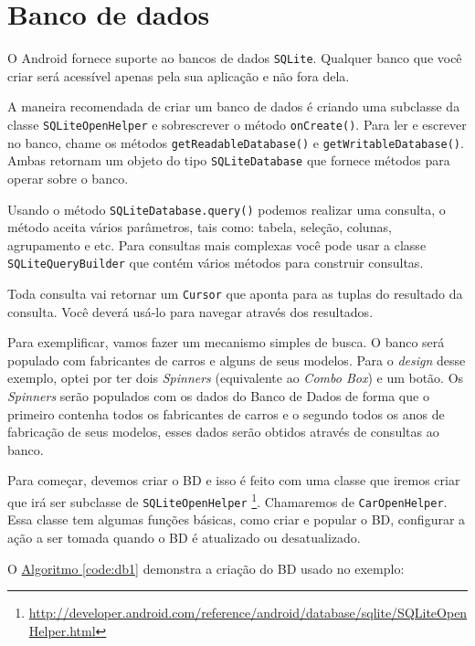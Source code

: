 \documentclass[a4paper,12pt,brazil,oneside]{book}
\begin{document}
		\section{Banco de dados}

		O Android fornece suporte ao bancos de dados \texttt{SQLite}. Qualquer banco que você criar será acessível apenas pela sua aplicação e não fora dela.

		A maneira recomendada de criar um banco de dados é criando uma subclasse da classe \texttt{SQLiteOpenHelper} e sobrescrever o método \texttt{onCreate()}. Para ler e escrever no banco, chame os métodos \texttt{getReadableDatabase()} e \texttt{getWritableDatabase()}. Ambas retornam um objeto do tipo \texttt{SQLiteDatabase} que fornece métodos para operar sobre o banco.

		Usando o método \texttt{SQLiteDatabase.query()}  podemos realizar uma consulta, o método aceita vários parâmetros, tais como: tabela, seleção, colunas, agrupamento e etc. Para consultas mais complexas você pode usar a classe \texttt{SQLiteQueryBuilder} que contém vários métodos para construir consultas.

		Toda consulta vai retornar um \texttt{Cursor} que aponta para as tuplas do resultado da consulta. Você deverá usá-lo para navegar através dos resultados.

		Para exemplificar, vamos fazer um mecanismo simples de busca. O banco será populado com fabricantes de carros e alguns de seus modelos. Para o \emph{design} desse exemplo, optei por ter dois \emph{Spinners} (equivalente ao \emph{Combo Box}) e um botão. Os \emph{Spinners} serão populados com os dados do Banco de Dados de forma que o primeiro contenha todos os fabricantes de carros e o segundo todos os anos de fabricação de seus modelos, esses dados serão obtidos através de consultas ao banco.

		Para começar, devemos  criar o BD e isso é feito com uma classe que iremos criar que irá ser subclasse de \texttt{SQLiteOpenHelper}
\footnote{\href{http://developer.android.com/reference/android/database/sqlite/SQLiteOpenHelper.html}{http://developer.android.com/reference/android/database/sqlite/SQLiteOpenHelper.html}}.
 Chamaremos de \texttt{CarOpenHelper}. Essa classe tem algumas funções básicas, como criar e popular o BD, configurar a ação a ser tomada quando o BD é atualizado ou desatualizado.

		O \hyperref[code:db1]{Algoritmo \ref*{code:db1}} demonstra a criação do BD usado no exemplo:
\end{document}
